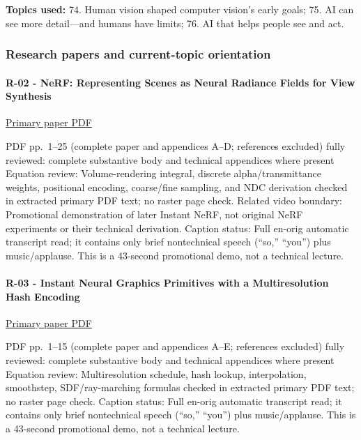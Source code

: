 \textbf{Topics used:} 74. Human vision shaped computer vision's early goals; 75. AI can see more detail---and humans have limits; 76. AI that helps people see and act.

\subsubsection{Research papers and current-topic orientation}\label{research-papers-and-current-topic-orientation}

\paragraph{R-02 - NeRF: Representing Scenes as Neural Radiance Fields for View Synthesis}\label{r-02---nerf-representing-scenes-as-neural-radiance-fields-for-view-synthesis}

\href{https://arxiv.org/pdf/2003.08934}{Primary paper PDF}

PDF pp.~1--25 (complete paper and appendices A--D; references excluded) fully reviewed: complete substantive body and technical appendices where present Equation review: Volume-rendering integral, discrete alpha/transmittance weights, positional encoding, coarse/fine sampling, and NDC derivation checked in extracted primary PDF text; no raster page check. Related video boundary: Promotional demonstration of later Instant NeRF, not original NeRF experiments or their technical derivation. Caption status: Full en-orig automatic transcript read; it contains only brief nontechnical speech (``so,'' ``you'') plus music/applause. This is a 43-second promotional demo, not a technical lecture.

\paragraph{R-03 - Instant Neural Graphics Primitives with a Multiresolution Hash Encoding}\label{r-03---instant-neural-graphics-primitives-with-a-multiresolution-hash-encoding}

\href{https://nvlabs.github.io/instant-ngp/assets/mueller2022instant.pdf}{Primary paper PDF}

PDF pp.~1--15 (complete paper and appendices A--E; references excluded) fully reviewed: complete substantive body and technical appendices where present Equation review: Multiresolution schedule, hash lookup, interpolation, smoothstep, SDF/ray-marching formulas checked in extracted primary PDF text; no raster page check. Caption status: Full en-orig automatic transcript read; it contains only brief nontechnical speech (``so,'' ``you'') plus music/applause. This is a 43-second promotional demo, not a technical lecture.

